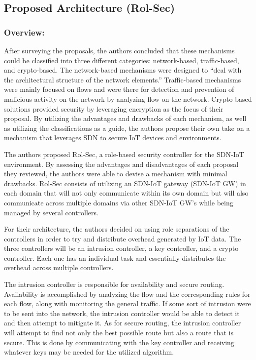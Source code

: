 \subsection {Proposed Architecture (Rol-Sec)} 
\subsubsection {Overview:}

After surveying the proposals, the authors concluded that these mechanisms could be classified into three different categories: network-based, traffic-based, and crypto-based. The network-based mechanisms were designed to “deal with the architectural structure of the network elements.” \cite {kalkan2017securing} Traffic-based mechanisms were mainly focused on flows and were there for detection and prevention of malicious activity on the network by analyzing flow on the network. Crypto-based solutions provided security by leveraging encryption as the focus of their proposal. By utilizing the advantages and drawbacks of each mechanism, as well as utilizing the classifications as a guide, the authors propose their own take on a mechanism that leverages SDN to secure IoT devices and environments. 

\smallskip

The authors proposed Rol-Sec, a role-based security controller for the SDN-IoT environment. By assessing the advantages and disadvantages of each proposal they reviewed, the authors were able to devise a mechanism with minimal drawbacks. Rol-Sec consists of utilizing an SDN-IoT gateway (SDN-IoT GW) in each domain that will not only communicate within its own domain but will also communicate across multiple domains via other SDN-IoT GW’s while being managed by several controllers. 

\smallskip

For their architecture, the authors decided on using role separations of the controllers in order to try and distribute overhead generated by IoT data. The three controllers will be an intrusion controller, a key controller, and a crypto controller. Each one has an individual task and essentially distributes the overhead across multiple controllers.

\smallskip

The intrusion controller is responsible for availability and secure routing. Availability is accomplished by analyzing the flow and the corresponding rules for each flow, along with monitoring the general traffic. If some sort of intrusion were to be sent into the network, the intrusion controller would be able to detect it and then attempt to mitigate it. As for secure routing, the intrusion controller will attempt to find not only the best possible route but also a route that is secure. This is done by communicating with the key controller and receiving whatever keys may be needed for the utilized algorithm. 

